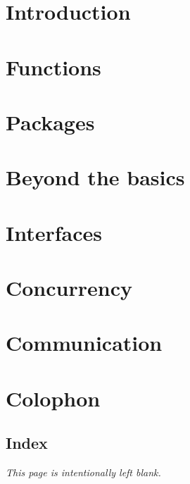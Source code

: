 \documentclass[a4paper,twoside,openleft]{blocksbook}
\begin{document}
\chapter{Introduction}
\label{chap:intro}


\chapter{Functions}
\label{chap:functions}


\chapter{Packages}
\label{chap:packages}


\chapter{Beyond the basics}
\label{chap:beyond}


\chapter{Interfaces}
\label{chap:interfaces}


\chapter{Concurrency}
\label{chap:channels}


\chapter{Communication}
\label{chap:communication}


\appendix

\chapter{Colophon}


\begin{twocolumn}
\chapter{Index}
\printindex
\end{twocolumn}
\begin{onecolumn}



\newpage
\thispagestyle{empty}
\begin{center}
\emph{This page is intentionally left blank.}
\end{center}
\end{onecolumn}
\end{document}
